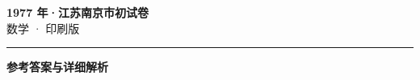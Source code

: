 \documentclass[zihao=5, a4paper]{ctexart}
\begin{document}
\begin{center}
  {\Large\bfseries 1977 年·江苏南京市初试卷}\\[4pt]
  {\large 数学 · 印刷版}
\end{center}
\medskip
{}

\par\bigskip\hrule\bigskip
{}
\begin{center}{\large\bfseries 参考答案与详细解析}\end{center}
\smallskip

\end{document}
